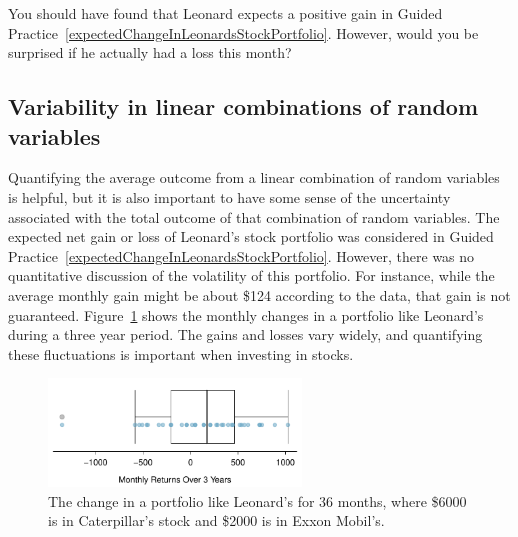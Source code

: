 \begin{exercisewrap}
\begin{nexercise}
You should have found that Leonard expects a positive gain
in Guided Practice~\ref{expectedChangeInLeonardsStockPortfolio}.
However, would you be surprised if he actually had
a loss this month?\footnotemark
\end{nexercise}
\end{exercisewrap}


\D{\newpage}

\subsection{Variability in linear combinations of random variables}
\label{var_lin_combo_of_RVs}

Quantifying the average outcome from a linear combination
of random variables is helpful, but it is also important
to have some sense of the uncertainty associated with
the total outcome of that combination of random variables.
The expected net gain or loss of Leonard's stock portfolio
was considered in Guided Practice~\ref{expectedChangeInLeonardsStockPortfolio}.
However, there was no quantitative discussion of the
volatility of this portfolio.
For instance, while the average monthly gain might be
about \$124 according to the data, that gain is not guaranteed.
Figure~\ref{changeInLeonardsStockPortfolioFor36Months}
shows the monthly changes in a portfolio like Leonard's during
a three year period.
The gains and losses vary widely, and quantifying these
fluctuations is important when investing in stocks.

\begin{figure}[ht]
\centering
\includegraphics[width=0.6\textwidth]{ch_probability/figures/changeInLeonardsStockPortfolioFor36Months/changeInLeonardsStockPortfolioFor36Months}
\caption{The change in a portfolio like Leonard's for 36 months,
    where \$6000 is in Caterpillar's stock and \$2000 is in
    Exxon Mobil's.}
\label{changeInLeonardsStockPortfolioFor36Months}
\end{figure}


